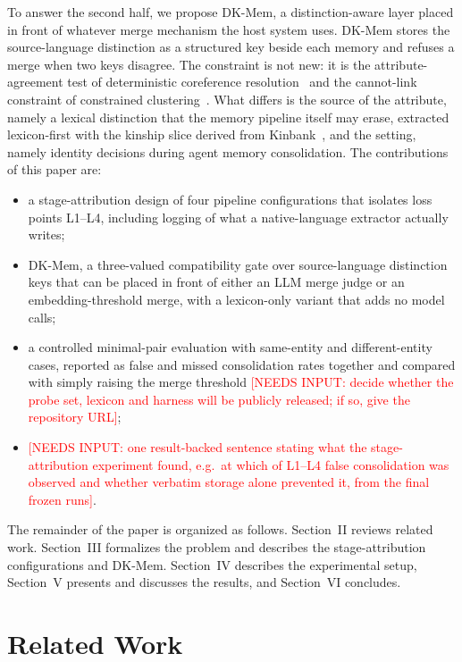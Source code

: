 \documentclass[conference]{IEEEtran}
\newcommand{\pending}[1]{\textcolor{red}{#1}}
\begin{document}
To answer the second half, we propose DK-Mem, a distinction-aware layer
placed in front of whatever merge mechanism the host system uses. DK-Mem
stores the source-language distinction as a structured key beside each
memory and refuses a merge when two keys disagree. The constraint is not
new: it is the attribute-agreement test of deterministic coreference
resolution~\cite{sieve2010,sieve2013} and the cannot-link constraint of
constrained clustering~\cite{wagstaff2001}. What differs is the source of
the attribute, namely a lexical distinction that the memory pipeline itself
may erase, extracted lexicon-first with the kinship slice derived from
Kinbank~\cite{kinbank}, and the setting, namely identity decisions during
agent memory consolidation. The contributions of this paper are:
\begin{itemize}
\item a stage-attribution design of four pipeline configurations that
isolates loss points L1--L4, including logging of what a native-language
extractor actually writes;
\item DK-Mem, a three-valued compatibility gate over source-language
distinction keys that can be placed in front of either an LLM merge judge
or an embedding-threshold merge, with a lexicon-only variant that adds no
model calls;
\item a controlled minimal-pair evaluation with same-entity and
different-entity cases, reported as false and missed consolidation rates
together and compared with simply raising the merge threshold
\pending{[NEEDS INPUT: decide whether the probe set, lexicon and harness
will be publicly released; if so, give the repository URL]};
\item \pending{[NEEDS INPUT: one result-backed sentence stating what the
stage-attribution experiment found, e.g.\ at which of L1--L4
false consolidation was observed and whether verbatim storage alone
prevented it, from the final frozen runs]}.
\end{itemize}

The remainder of the paper is organized as follows. Section~II reviews
related work. Section~III formalizes the problem and describes the
stage-attribution configurations and DK-Mem. Section~IV describes the
experimental setup, Section~V presents and discusses the results, and
Section~VI concludes.

\section{Related Work}
\end{document}
